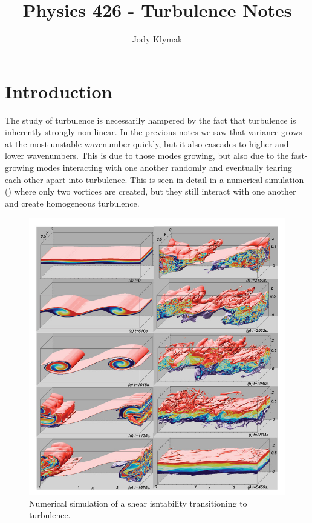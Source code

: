 \documentclass[11pt]{article}
\title{Physics 426 - Turbulence Notes}
\author{Jody Klymak}
\begin{document}
\maketitle
\pagestyle{fancy}

\section{Introduction}

The study of turbulence is necessarily hampered by the fact that turbulence is inherently strongly non-linear.  In the previous notes we saw that variance grows at the most unstable wavenumber quickly, but it also cascades to higher and lower wavenumbers.  This is due to those modes growing, but also due to the fast-growing modes interacting with one another randomly and eventually tearing each other apart into turbulence.  This is seen in detail in a numerical simulation () where only two vortices are created, but they still interact with one another and create  homogeneous turbulence.  

\begin{figure}[hbtp]
  \begin{center}\includegraphics[width=5in]{images/SmythEtAl05}
    \caption{Numerical simulation \citep{smythetal05} of a shear isntability transitioning to turbulence.}
    \label{fig:SmythEtAl05}
  \end{center}
\end{figure}
\end{document}
